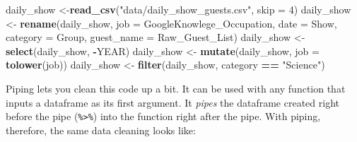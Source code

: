 \documentclass[]{book}
\makeatletter
\newenvironment{Shaded}{\begin{snugshade}}{\end{snugshade}}
\newcommand{\KeywordTok}[1]{\textcolor[rgb]{0.13,0.29,0.53}{\textbf{#1}}}
\newcommand{\DataTypeTok}[1]{\textcolor[rgb]{0.13,0.29,0.53}{#1}}
\newcommand{\DecValTok}[1]{\textcolor[rgb]{0.00,0.00,0.81}{#1}}
\newcommand{\StringTok}[1]{\textcolor[rgb]{0.31,0.60,0.02}{#1}}
\newcommand{\OperatorTok}[1]{\textcolor[rgb]{0.81,0.36,0.00}{\textbf{#1}}}
\newcommand{\NormalTok}[1]{#1}
\newenvironment{kframe}{%
\medskip{}
\setlength{\fboxsep}{.8em}
 \def\at@end@of@kframe{}%
 \ifinner\ifhmode%
  \def\at@end@of@kframe{\end{minipage}}%
  \begin{minipage}{\columnwidth}%
 \fi\fi%
 \def\FrameCommand##1{\hskip\@totalleftmargin \hskip-\fboxsep
 \colorbox{shadecolor}{##1}\hskip-\fboxsep
     \hskip-\linewidth \hskip-\@totalleftmargin \hskip\columnwidth}%
 \MakeFramed {\advance\hsize-\width
   \@totalleftmargin\z@ \linewidth\hsize
   \@setminipage}}%
 {\par\unskip\endMakeFramed%
 \at@end@of@kframe}
\renewenvironment{Shaded}{\begin{kframe}}{\end{kframe}}
\theoremstyle{definition}
\theoremstyle{definition}
\theoremstyle{definition}
\theoremstyle{remark}
\makeatother
\begin{document}
\begin{Shaded}
\begin{Highlighting}[]
\NormalTok{daily_show <-}\KeywordTok{read_csv}\NormalTok{(}\StringTok{"data/daily_show_guests.csv"}\NormalTok{,}
                      \DataTypeTok{skip =} \DecValTok{4}\NormalTok{)}
\NormalTok{daily_show <-}\StringTok{ }\KeywordTok{rename}\NormalTok{(daily_show, }
                     \DataTypeTok{job =}\NormalTok{ GoogleKnowlege_Occupation,}
                     \DataTypeTok{date =}\NormalTok{ Show,}
                     \DataTypeTok{category =}\NormalTok{ Group,}
                     \DataTypeTok{guest_name =}\NormalTok{ Raw_Guest_List)}
\NormalTok{daily_show <-}\StringTok{ }\KeywordTok{select}\NormalTok{(daily_show, }\OperatorTok{-}\NormalTok{YEAR) }
\NormalTok{daily_show <-}\StringTok{ }\KeywordTok{mutate}\NormalTok{(daily_show, }\DataTypeTok{job =} \KeywordTok{tolower}\NormalTok{(job))}
\NormalTok{daily_show <-}\StringTok{ }\KeywordTok{filter}\NormalTok{(daily_show, category }\OperatorTok{==}\StringTok{ "Science"}\NormalTok{)}
\end{Highlighting}
\end{Shaded}

Piping lets you clean this code up a bit. It can be used with any
function that inputs a dataframe as its first argument. It \emph{pipes}
the dataframe created right before the pipe
(\texttt{\%\textgreater{}\%}) into the function right after the pipe.
With piping, therefore, the same data cleaning looks like:

\begin{Shaded}
\end{Shaded}
\end{document}
